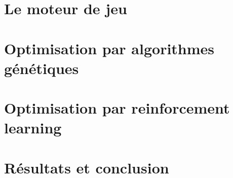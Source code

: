 


\lfoot[\thepage]{}
\rfoot[]{\thepage}


\renewcommand{\encadre}[1]{
	\begin{center}
		\fbox{\parbox{0.9\linewidth}{
				\medskip
				
				#1
				
				\medskip
		}}
	\end{center}	
}	

\usepackage{hyperref}


	\frontmatter
	
	
	\thispagestyle{fancy}
	\pagestyle{fancy}
	

	
	\mainmatter
	
	\thispagestyle{fancy}
	
	
	
	

	
	
	\part{Le moteur de jeu}
	
	
	
	
	
	\part{Optimisation par algorithmes génétiques}
	
	
	
	\part{Optimisation par reinforcement learning}
	
	
	
	
	\part{Résultats et conclusion}
	
	
	
	
	

	

	
	

